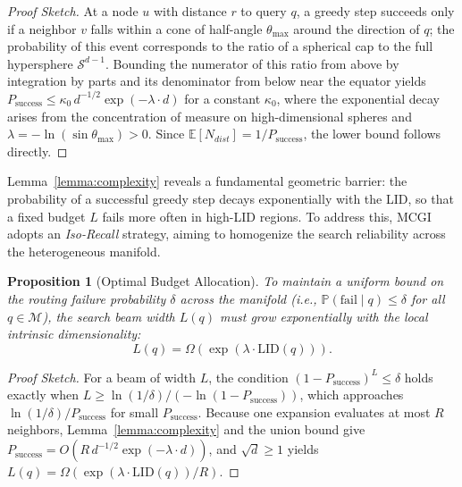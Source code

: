 \documentclass{article}
\theoremstyle{plain}
\newtheorem{proposition}[theorem]{Proposition}
\theoremstyle{definition}
\theoremstyle{remark}
\newcommand{\ours}{MCGI\xspace}
\begin{document}
\begin{proof}[Proof Sketch]
At a node $u$ with distance $r$ to query $q$, a greedy step succeeds only if a neighbor $v$ falls within a cone of half-angle $\theta_{\max}$ around the direction of $q$; the probability of this event corresponds to the ratio of a spherical cap to the full hypersphere $\mathcal{S}^{d-1}$.
Bounding the numerator of this ratio from above by integration by parts and its denominator from below near the equator yields $P_{\text{success}} \le \kappa_0\, d^{-1/2} \exp(-\lambda \cdot d)$ for a constant $\kappa_0$, where the exponential decay arises from the concentration of measure on high-dimensional spheres and $\lambda = -\ln(\sin\theta_{\max}) > 0$.
Since $\mathbb{E}[N_{dist}] = 1/P_{\text{success}}$, the lower bound follows directly.
\end{proof}

Lemma~\ref{lemma:complexity} reveals a fundamental geometric barrier: the probability of a successful greedy step decays exponentially with the LID, so that a fixed budget $L$ fails more often in high-LID regions. To address this, \ours{} adopts an \textit{Iso-Recall} strategy, aiming to homogenize the search reliability across the heterogeneous manifold.

\begin{proposition}[Optimal Budget Allocation]
\label{thm:oba}
To maintain a uniform bound on the routing failure probability $\delta$ across the manifold (i.e., $\mathbb{P}(\text{fail}\;|\;q) \le \delta$ for all $q \in \mathcal{M}$), the search beam width $L(q)$ must grow exponentially with the local intrinsic dimensionality:
\begin{equation}
    L(q) = \Omega\left( \exp\left( \lambda \cdot \text{LID}(q) \right) \right).
\end{equation}
\end{proposition}

\begin{proof}[Proof Sketch]
For a beam of width $L$, the condition $(1 - P_{\text{success}})^L \leq \delta$ holds exactly when $L \geq \ln(1/\delta) / (-\ln(1-P_{\text{success}}))$, which approaches $\ln(1/\delta)/P_{\text{success}}$ for small $P_{\text{success}}$.
Because one expansion evaluates at most $R$ neighbors, Lemma~\ref{lemma:complexity} and the union bound give $P_{\text{success}} = O(R\, d^{-1/2}\exp(-\lambda \cdot d))$, and $\sqrt{d} \ge 1$ yields $L(q) = \Omega(\exp(\lambda \cdot \text{LID}(q))/R)$.
\end{proof}
\end{document}
